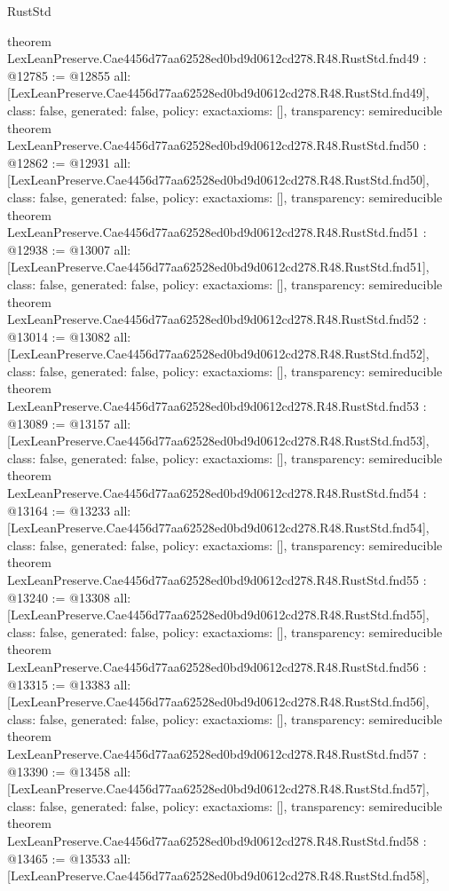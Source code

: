 \begin{lexlean}{RustStd}
\begin{coremodule}
{}
theorem LexLeanPreserve.Cae4456d77aa62528ed0bd9d0612cd278.R48.RustStd.fnd49 : @12785 := @12855 {
  all: [LexLeanPreserve.Cae4456d77aa62528ed0bd9d0612cd278.R48.RustStd.fnd49],
  class: false,
  generated: false,
  policy: exact{axioms: []},
  transparency: semireducible
}
theorem LexLeanPreserve.Cae4456d77aa62528ed0bd9d0612cd278.R48.RustStd.fnd50 : @12862 := @12931 {
  all: [LexLeanPreserve.Cae4456d77aa62528ed0bd9d0612cd278.R48.RustStd.fnd50],
  class: false,
  generated: false,
  policy: exact{axioms: []},
  transparency: semireducible
}
theorem LexLeanPreserve.Cae4456d77aa62528ed0bd9d0612cd278.R48.RustStd.fnd51 : @12938 := @13007 {
  all: [LexLeanPreserve.Cae4456d77aa62528ed0bd9d0612cd278.R48.RustStd.fnd51],
  class: false,
  generated: false,
  policy: exact{axioms: []},
  transparency: semireducible
}
theorem LexLeanPreserve.Cae4456d77aa62528ed0bd9d0612cd278.R48.RustStd.fnd52 : @13014 := @13082 {
  all: [LexLeanPreserve.Cae4456d77aa62528ed0bd9d0612cd278.R48.RustStd.fnd52],
  class: false,
  generated: false,
  policy: exact{axioms: []},
  transparency: semireducible
}
theorem LexLeanPreserve.Cae4456d77aa62528ed0bd9d0612cd278.R48.RustStd.fnd53 : @13089 := @13157 {
  all: [LexLeanPreserve.Cae4456d77aa62528ed0bd9d0612cd278.R48.RustStd.fnd53],
  class: false,
  generated: false,
  policy: exact{axioms: []},
  transparency: semireducible
}
theorem LexLeanPreserve.Cae4456d77aa62528ed0bd9d0612cd278.R48.RustStd.fnd54 : @13164 := @13233 {
  all: [LexLeanPreserve.Cae4456d77aa62528ed0bd9d0612cd278.R48.RustStd.fnd54],
  class: false,
  generated: false,
  policy: exact{axioms: []},
  transparency: semireducible
}
theorem LexLeanPreserve.Cae4456d77aa62528ed0bd9d0612cd278.R48.RustStd.fnd55 : @13240 := @13308 {
  all: [LexLeanPreserve.Cae4456d77aa62528ed0bd9d0612cd278.R48.RustStd.fnd55],
  class: false,
  generated: false,
  policy: exact{axioms: []},
  transparency: semireducible
}
theorem LexLeanPreserve.Cae4456d77aa62528ed0bd9d0612cd278.R48.RustStd.fnd56 : @13315 := @13383 {
  all: [LexLeanPreserve.Cae4456d77aa62528ed0bd9d0612cd278.R48.RustStd.fnd56],
  class: false,
  generated: false,
  policy: exact{axioms: []},
  transparency: semireducible
}
theorem LexLeanPreserve.Cae4456d77aa62528ed0bd9d0612cd278.R48.RustStd.fnd57 : @13390 := @13458 {
  all: [LexLeanPreserve.Cae4456d77aa62528ed0bd9d0612cd278.R48.RustStd.fnd57],
  class: false,
  generated: false,
  policy: exact{axioms: []},
  transparency: semireducible
}
theorem LexLeanPreserve.Cae4456d77aa62528ed0bd9d0612cd278.R48.RustStd.fnd58 : @13465 := @13533 {
  all: [LexLeanPreserve.Cae4456d77aa62528ed0bd9d0612cd278.R48.RustStd.fnd58],
}
\end{coremodule}
\end{lexlean}
